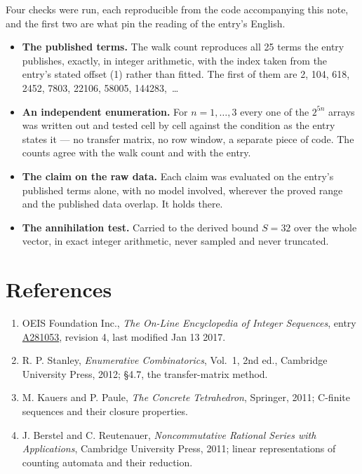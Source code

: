 \documentclass[11pt]{article}
\theoremstyle{definition}
\begin{document}
Four checks were run, each reproducible from the code accompanying this note, and the first two are what pin the reading of the entry's English.

\begin{itemize}

\item {\bfseries The published terms.} The walk count reproduces all 25 terms the entry publishes, exactly, in integer arithmetic, with the index taken from the entry's stated offset (1) rather than fitted. The first of them are 2, 104, 618, 2452, 7803, 22106, 58005, 144283,~\dots

\item {\bfseries An independent enumeration.} For $n = 1,\dots,3$ every one of the $2^{5n}$ arrays was written out and tested cell by cell against the condition as the entry states it --- no transfer matrix, no row window, a separate piece of code. The counts agree with the walk count and with the entry.

\item {\bfseries The claim on the raw data.} Each claim was evaluated on the entry's published terms alone, with no model involved, wherever the proved range and the published data overlap. It holds there.

\item {\bfseries The annihilation test.} Carried to the derived bound $S = 32$ over the whole vector, in exact integer arithmetic, never sampled and never truncated.

\end{itemize}

\section{References}

\begin{enumerate}

\item OEIS Foundation Inc., \emph{The On-Line Encyclopedia of Integer Sequences}, entry \href{https://oeis.org/A281053}{A281053}, revision 4, last modified Jan 13 2017.

\item R. P. Stanley, \emph{Enumerative Combinatorics}, Vol.~1, 2nd ed., Cambridge University Press, 2012; \S4.7, the transfer-matrix method.

\item M. Kauers and P. Paule, \emph{The Concrete Tetrahedron}, Springer, 2011; C-finite sequences and their closure properties.

\item J. Berstel and C. Reutenauer, \emph{Noncommutative Rational Series with Applications}, Cambridge University Press, 2011; linear representations of counting automata and their reduction.

\end{enumerate}
\end{document}
